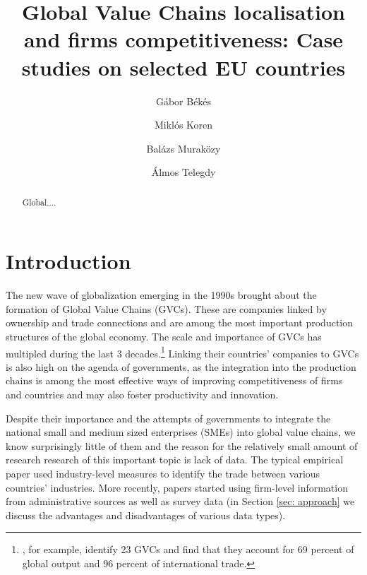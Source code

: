 \documentclass[final, dvipsnames, authoryear,12pt]{elsarticle}
\begin{document}
\begin{frontmatter}
\title{Global Value Chains localisation and firms competitiveness: Case studies on selected EU countries}






\author[gb]{G\'{a}bor B\'{e}k\'{e}s}
\author[mk]{Miklós Koren}
\author[bm]{Balázs Muraközy}
\author[at]{Álmos Telegdy}
 \address[gb]{Central European University, Institute of Economics and CEPR}
 \address[mk]{Central European University, Institute of Economics and CEPR}
 \address[bm]{University of Liverpool, Institute of Economics }
 \address[at]{National Bank of Hungary}
 
 




\begin{abstract}
    Global....
\end{abstract}


\end{frontmatter}

\section{Introduction}

The new wave of globalization emerging in the 1990s brought about the formation of Global Value Chains (GVCs). These are companies linked by ownership and trade connections and are among the most important production structures of the global economy. The scale and importance of GVCs has multipled during the last 3 decades.\footnote{\cite{mckinsey2019gvc}, for example, identify 23 GVCs and find that they account for 69 percent of global output and 96 percent of international trade.} Linking their countries' companies to GVCs is also high on the agenda of governments, as the integration into the production chains is among the most effective ways of improving competitiveness of firms and countries and may also foster productivity and innovation.

Despite their importance and the attempts of governments to integrate the national small and medium sized enterprises (SMEs) into global value chains, we know surprisingly little of them and the reason for the relatively small amount of research research of this important topic is lack of data. The typical empirical paper used industry-level measures to identify the trade between various countries' industries. More recently, papers started using firm-level information from administrative sources as well as survey data (in Section \ref{sec: approach} we discuss the advantages and disadvantages of various data types).
\end{document}
